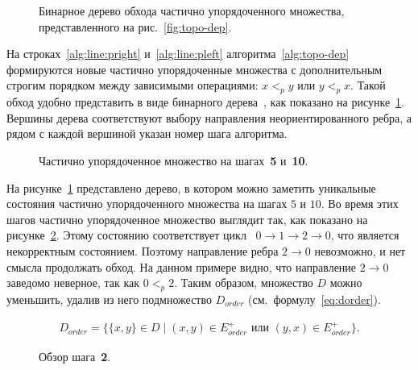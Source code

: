 \begin{figure}[ht]
  \centerfloat{
    
  }
  \caption{Бинарное дерево обхода частично упорядоченного множества,
  представленного на рис.~\ref{fig:topo-dep}.}
  \label{fig:topo-dep-tree}
\end{figure}

На строках~\ref{alg:line:pright} и~\ref{alg:line:pleft}
алгоритма~\ref{alg:topo-dep} формируются новые частично упорядоченные
множества с дополнительным строгим порядком между зависимыми
операциями: $x <_{p} y$ или $y <_{p} x$. Такой обход удобно
представить в виде бинарного дерева~\cite{binary-tree}, как показано
на рисунке~\ref{fig:topo-dep-tree}. Вершины дерева соответствуют
выбору направления неориентированного ребра, а рядом с каждой
вершиной указан номер шага алгоритма.

\begin{figure}[ht]
  \centerfloat{
    
  }
  \caption{Частично упорядоченное множество на шагах~\textbf{5}
  и~\textbf{10}.}
  \label{fig:poset-for-node-5-10}
\end{figure}

На рисунке~\ref{fig:topo-dep-tree} представлено дерево, в котором
можно заметить уникальные состояния частично упорядоченного множества
на шагах $5$ и $10$. Во время этих шагов частично упорядоченное
множество выглядит так, как показано на
рисунке~\ref{fig:poset-for-node-5-10}. Этому состоянию соответствует
цикл~\cite{cycle} $0 \rightarrow 1 \rightarrow 2 \rightarrow 0$, что
является некорректным состоянием. Поэтому направление ребра $2
\rightarrow 0$ невозможно, и нет смысла продолжать обход. На данном
примере видно, что направление $2 \rightarrow 0$ заведомо неверное,
так как $0 <_{p} 2$. Таким образом, множество $D$ можно уменьшить,
удалив из него подмножество $D_{order}$ (см.~формулу~\ref{eq:dorder}).

\begin{equation}
  \label{eq:dorder}
  \begin{aligned}
    D_{order} = \{\{x, y\} \in D \mid (x, y) \in E_{order}^{+}
      \text{ или }
    (y, x) \in E_{order}^{+}\}.
  \end{aligned}
\end{equation}

\begin{figure}[ht]
  \centering
  \centerfloat{
    
  }
  \caption{Обзор шага~\textbf{2}.}
  \label{fig:detail-traversal-for-step2}
\end{figure}

